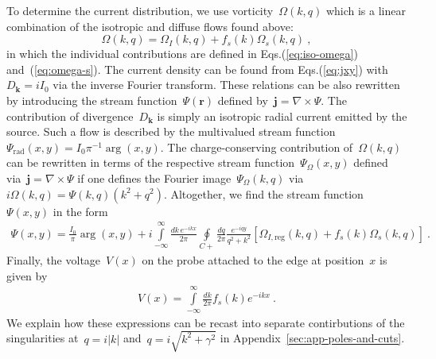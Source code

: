 \documentclass[preprint,aps,eqsecnum, prb]{revtex4-1}
\begin{document}
To determine the current distribution, we use vorticity~$\Omega(k, q)$
which is a linear combination of the isotropic and diffuse flows found
above:
\begin{equation}
  \Omega(k, q) = \Omega_{I}(k, q) + f_{s}(k) \Omega_{s}(k, q)
\ ,
\end{equation}
in which the individual contributions are defined in Eqs.(\ref{eq:iso-omega})
and~(\ref{eq:omega-s}). The current density can be found
from Eqs.(\ref{eq:jxy}) with~$D_{\bm k} = i I_0$
via the inverse Fourier transform. These relations
can be also rewritten by introducing the stream function~$\Psi({\bm r})$
defined by~${\bm j} = \nabla \times \Psi$. The
contribution of divergence~$D_{\bm k}$ is simply an isotropic
radial current emitted by the source. Such a flow is described
by the multivalued stream
function~$\Psi_\mathrm{rad}(x, y) = I_0 \pi^{-1}\arg(x, y)$.
The charge-conserving
contribution of~$\Omega(k, q)$ can be rewritten in terms of
the respective stream function~$\Psi_\Omega(x, y)$
defined via~${\bm j} = \nabla \times \Psi$ if one defines
the Fourier image~$\Psi_\Omega(k, q)$ via
$i\Omega(k, q) = \Psi(k, q)(k^2 + q^2)$. Altogether, we find
the stream function~$\Psi(x, y)$ in the form
\begin{align}
\label{eq:psi-final}
  \Psi(x, y) = \frac{I_0}{\pi} \arg(x, y)
  + i\int\limits_{-\infty}^{\infty} \frac{dk\, e^{-ikx}}{2\pi}
  \oint\limits_{C+} \frac{dq}{2\pi} \frac{e^{-iqy}}{q^2 + k^2}
  \left[\Omega_{I, \mathrm{reg}}(k, q)
  + f_s(k) \Omega_{s}(k, q) \right]\ .
\end{align}
Finally, the voltage~$V(x)$ on the probe attached to the edge at position~$x$
is given by
\begin{align}
  V(x) =  \int\limits_{-\infty}^{\infty} \frac{dk}{2\pi} f_s(k) e^{-ik x}
  \ .
\end{align}
We explain how these expressions can be recast into separate 
contirbutions of the singularities at~$q = i|k|$ and~$q = i \sqrt{k^2 + \gamma^2}$
in Appendix~\ref{sec:app-poles-and-cuts}.
\end{document}
